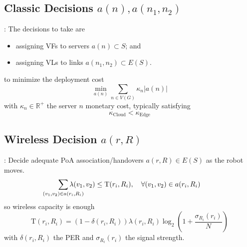 \documentclass[aspectratio=169,dvipsnames]{beamer}
\begin{document}
\subsection{Classic Decisions $a(n), a(n_1,n_2)$} 
\begin{frame}{\secname: \subsecname}
    The decisions to take are
    \begin{itemize}
        \item assigning VFs to servers $a(n)\subset S$; and
        \item assigning VLs to links $a(n_1,n_2)\subset E(S)$.
    \end{itemize}
    to minimize the deployment cost
    \begin{equation}
        \min_{a(n)} \sum_{n\in V(G)} \kappa_n |a(n)|
    \end{equation}
    with $\kappa_n\in\mathbb{R}^+$
    the server $n$ monetary cost, typically satisfying
    \begin{equation}
        \kappa_{\text{Cloud}} < \kappa_{\text{Edge}}
    \end{equation}
\end{frame}



\subsection{Wireless Decision $a(r,R)$}
\begin{frame}{\secname: \subsecname}
    Decide adequate PoA association/handovers
    $a(r,R)\in E(S)$ as the robot moves.
    \begin{equation}
        \sum_{\mathclap{(v_1,v_2)\in a(r_i,R_i)}} \lambda(v_1,v_2) \leq \mathrm{T}(r_i, R_i), \quad \forall (v_1,v_2)\in a(r_i,R_i)
        \label{eq:wireless-bandwidth-capacity}
    \end{equation}
    so wireless capacity is enough
    \begin{equation}
        \mathrm{T}(r_i,R_i) = (1-\delta(r_i,R_i))\lambda(r_i,R_i)\log_2\left(1+\frac{ \sigma_{R_i}(r_i)}{N}\right)
        \label{eq:channel-capacity}
    \end{equation}
    with $\delta(r_i,R_i)$ the PER and
    $\sigma_{R_i}(r_i)$ the signal strength.
\end{frame}
\end{document}
